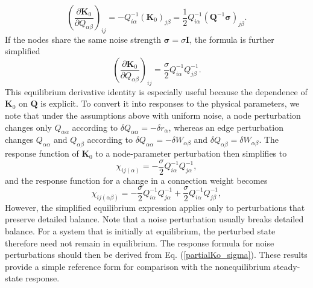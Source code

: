 \begin{equation}
    \left( \frac{\partial \mathbf{K}_0}{\partial Q_{\alpha\beta}} \right)_{ij} = -Q^{-1}_{i\alpha} (\mathbf{K}_0)_{j\beta} = \frac{1}{2} Q^{-1}_{i\alpha} (\mathbf{Q}^{-1}\boldsymbol{\sigma})_{j\beta}.
\end{equation}
If the nodes share the same noise strength $\boldsymbol{\sigma}=\sigma \mathbf{I}$, the formula is further simplified
\begin{equation}
    \left( \frac{\partial \mathbf{K}_0}{\partial Q_{\alpha\beta}} \right)_{ij} = \frac{\sigma}{2} Q^{-1}_{i\alpha} Q^{-1}_{j\beta}.
\end{equation}
This equilibrium derivative identity is especially useful because the dependence of $\mathbf{K}_0$ on $\mathbf{Q}$ is explicit. To convert it into responses to the physical parameters, we note that under the assumptions above with uniform noise, a node perturbation changes only $Q_{\alpha\alpha}$ according to $\delta Q_{\alpha\alpha}=-\delta r_\alpha$, whereas an edge perturbation changes $Q_{\alpha\alpha}$ and $Q_{\alpha\beta}$ according to $\delta Q_{\alpha\alpha}=-\delta W_{\alpha\beta}$ and $\delta Q_{\alpha\beta}=\delta W_{\alpha\beta}$. The response function of $\mathbf{K}_0$ to a node-parameter perturbation then simplifies to
\begin{equation}
    \chi_{ij(\alpha)} = -\frac{\sigma}{2} Q^{-1}_{i\alpha} Q^{-1}_{j\alpha},
    \label{chiKodr_eq}
\end{equation}
and the response function for a change in a connection weight becomes
\begin{equation}
    \chi_{ij(\alpha\beta)} = -\frac{\sigma}{2} Q^{-1}_{i\alpha} Q^{-1}_{j\alpha}+\frac{\sigma}{2} Q^{-1}_{i\alpha} Q^{-1}_{j\beta},
    \label{chiKodW_eq}
\end{equation}
However, the simplified equilibrium expression applies only to perturbations that preserve detailed balance. Note that a noise perturbation usually breaks detailed balance. For a system that is initially at equilibrium, the perturbed state therefore need not remain in equilibrium. The response formula for noise perturbations should then be derived from Eq. (\ref{partialKo_sigma}). These results provide a simple reference form for comparison with the nonequilibrium steady-state response.
